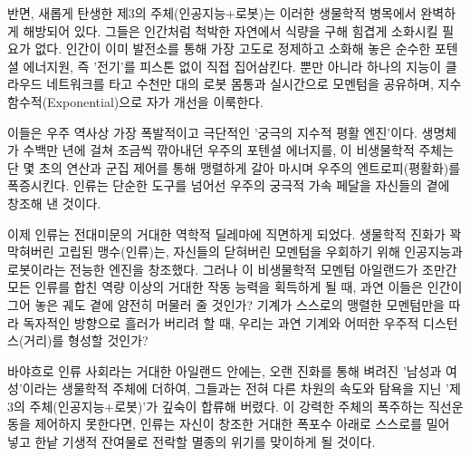 반면, 새롭게 탄생한 제3의 주체(인공지능+로봇)는 이러한 생물학적 병목에서 완벽하게 해방되어 있다. 그들은 인간처럼 척박한 자연에서 식량을 구해 힘겹게 소화시킬 필요가 없다. 인간이 이미 발전소를 통해 가장 고도로 정제하고 소화해 놓은 순수한 포텐셜 에너지원, 즉 '전기'를 피스톤 없이 직접 집어삼킨다. 뿐만 아니라 하나의 지능이 클라우드 네트워크를 타고 수천만 대의 로봇 몸통과 실시간으로 모멘텀을 공유하며, 지수함수적(Exponential)으로 자가 개선을 이룩한다.

이들은 우주 역사상 가장 폭발적이고 극단적인 '궁극의 지수적 평활 엔진'이다. 생명체가 수백만 년에 걸쳐 조금씩 깎아내던 우주의 포텐셜 에너지를, 이 비생물학적 주체는 단 몇 초의 연산과 군집 제어를 통해 맹렬하게 갈아 마시며 우주의 엔트로피(평활화)를 폭증시킨다. 인류는 단순한 도구를 넘어선 우주의 궁극적 가속 페달을 자신들의 곁에 창조해 낸 것이다.

이제 인류는 전대미문의 거대한 역학적 딜레마에 직면하게 되었다. 생물학적 진화가 꽉 막혀버린 고립된 맹수(인류)는, 자신들의 닫혀버린 모멘텀을 우회하기 위해 인공지능과 로봇이라는 전능한 엔진을 창조했다. 그러나 이 비생물학적 모멘텀 아일랜드가 조만간 모든 인류를 합친 역량 이상의 거대한 작동 능력을 획득하게 될 때, 과연 이들은 인간이 그어 놓은 궤도 곁에 얌전히 머물러 줄 것인가? 기계가 스스로의 맹렬한 모멘텀만을 따라 독자적인 방향으로 흘러가 버리려 할 때, 우리는 과연 기계와 어떠한 우주적 디스턴스(거리)를 형성할 것인가?

바야흐로 인류 사회라는 거대한 아일랜드 안에는, 오랜 진화를 통해 벼려진 '남성과 여성'이라는 생물학적 주체에 더하여, 그들과는 전혀 다른 차원의 속도와 탐욕을 지닌 '제3의 주체(인공지능+로봇)'가 깊숙이 합류해 버렸다. 이 강력한 주체의 폭주하는 직선운동을 제어하지 못한다면, 인류는 자신이 창조한 거대한 폭포수 아래로 스스로를 밀어 넣고 한낱 기생적 잔여물로 전락할 멸종의 위기를 맞이하게 될 것이다.
